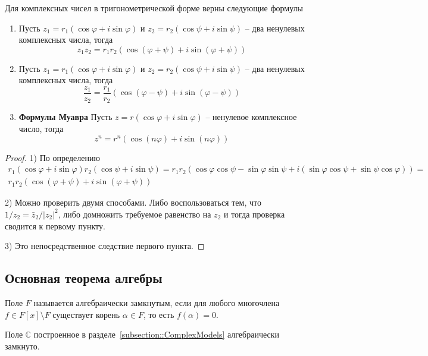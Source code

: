 \begin{claim*}
Для комплексных чисел в тригонометрической форме верны следующие формулы
\begin{enumerate}
\item Пусть $z_1 = r_1(\cos \varphi + i \sin \varphi)$ и $z_2=r_2(\cos \psi + i \sin \psi)$ -- два ненулевых комплексных числа, тогда
\[
z_1 z_2 = r_1 r_2 (\cos(\varphi + \psi) + i\sin(\varphi + \psi))
\]

\item Пусть $z_1 = r_1(\cos \varphi + i \sin \varphi)$ и $z_2=r_2(\cos \psi + i \sin \psi)$ -- два ненулевых комплексных числа, тогда
\[
\frac{z_1}{z_2} = \frac{r_1}{r_2}(\cos(\varphi - \psi) + i\sin(\varphi - \psi))
\]

\item {\bf Формулы Муавра}
Пусть $z = r(\cos \varphi + i \sin \varphi)$ -- ненулевое комплексное число, тогда
\[
z^n = r^n (\cos(n \varphi) + i \sin(n \varphi))
\]
\end{enumerate}
\end{claim*}
\begin{proof}
1) По определению
\begin{gather*}
r_1(\cos \varphi + i \sin \varphi) r_2 (\cos \psi + i \sin \psi) = r_1 r_2 (\cos \varphi \cos \psi - \sin \varphi \sin \psi + i (\sin\varphi \cos \psi + \sin \psi \cos \varphi)) =\\ r_1r_2(\cos(\varphi + \psi) + i\sin (\varphi + \psi))
\end{gather*}

2) Можно проверить двумя способами.
Либо воспользоваться тем, что $1/z_2 = \bar z_2 /|z_2|^2$, либо домножить требуемое равенство на $z_2$ и тогда проверка сводится к первому пункту.

3) Это непосредственное следствие первого пункта.
\end{proof}

\subsection{Основная теорема алгебры}

\begin{definition}
Поле $F$ называется алгебраически замкнутым, если для любого многочлена $f\in F[x]\setminus F$ существует корень $\alpha\in F$, то есть $f(\alpha) = 0$.
\end{definition}

\begin{claim}
\label{claim::CAlgClosed}
Поле $\mathbb C$ построенное в разделе~\ref{subsection::ComplexModels} алгебраически замкнуто.
\end{claim}

